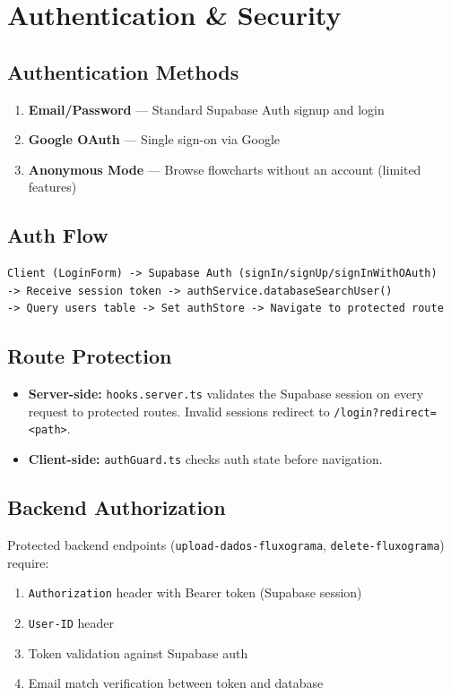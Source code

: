 \documentclass[11pt,a4paper]{article}
\newcommand{\code}[1]{\texttt{#1}}
\begin{document}
\section{Authentication \& Security}

\subsection{Authentication Methods}
\begin{enumerate}[noitemsep]
    \item \textbf{Email/Password} — Standard Supabase Auth signup and login
    \item \textbf{Google OAuth} — Single sign-on via Google
    \item \textbf{Anonymous Mode} — Browse flowcharts without an account (limited features)
\end{enumerate}

\subsection{Auth Flow}
\begin{lstlisting}
Client (LoginForm) -> Supabase Auth (signIn/signUp/signInWithOAuth)
-> Receive session token -> authService.databaseSearchUser()
-> Query users table -> Set authStore -> Navigate to protected route
\end{lstlisting}

\subsection{Route Protection}
\begin{itemize}[noitemsep]
    \item \textbf{Server-side:} \code{hooks.server.ts} validates the Supabase session
    on every request to protected routes. Invalid sessions redirect to
    \code{/login?redirect=<path>}.
    \item \textbf{Client-side:} \code{authGuard.ts} checks auth state before navigation.
\end{itemize}

\subsection{Backend Authorization}

Protected backend endpoints (\code{upload-dados-fluxograma}, \code{delete-fluxograma})
require:
\begin{enumerate}[noitemsep]
    \item \code{Authorization} header with Bearer token (Supabase session)
    \item \code{User-ID} header
    \item Token validation against Supabase auth
    \item Email match verification between token and database
\end{enumerate}
\end{document}
